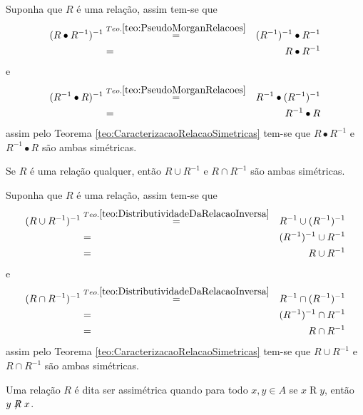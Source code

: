 \begin{prova}
	Suponha que $R$ é uma relação, assim tem-se que 
	\begin{eqnarray*}
		(R \bullet R^{-1})^{-1} & \stackrel{Teo. \ref{teo:PseudoMorganRelacoes}}{=} & (R^{-1})^{-1} \bullet R^{-1}\\
		&\stackrel{}{=}& R \bullet R^{-1}
	\end{eqnarray*}
	e
	\begin{eqnarray*}
		(R^{-1} \bullet R)^{-1} & \stackrel{Teo. \ref{teo:PseudoMorganRelacoes}}{=} &  R^{-1} \bullet (R^{-1})^{-1}\\
		&\stackrel{}{=}& R^{-1} \bullet R
	\end{eqnarray*}
	assim pelo Teorema \ref{teo:CaracterizacaoRelacaoSimetricas} tem-se que $R \bullet R^{-1}$ e  $R^{-1} \bullet R$ são ambas simétricas.
\end{prova}

\begin{teorema}
	Se $R$ é uma relação qualquer, então $R \cup R^{-1}$ e  $R \cap R^{-1}$ são ambas simétricas.
\end{teorema}

\begin{prova}
	Suponha que $R$ é uma relação, assim tem-se que 
	\begin{eqnarray*}
		(R \cup R^{-1})^{-1} & \stackrel{Teo. \ref{teo:DistributividadeDaRelacaoInversa}}{=} & R^{-1} \cup (R^{-1})^{-1}\\
		& = & (R^{-1})^{-1} \cup R^{-1}\\
		&\stackrel{}{=} & R \cup R^{-1}
	\end{eqnarray*}
	e
	\begin{eqnarray*}
		(R \cap R^{-1})^{-1} & \stackrel{Teo. \ref{teo:DistributividadeDaRelacaoInversa}}{=} & R^{-1} \cap (R^{-1})^{-1}\\
		& = & (R^{-1})^{-1} \cap R^{-1}\\
		&\stackrel{}{=} & R \cap R^{-1}
	\end{eqnarray*}
	assim pelo Teorema \ref{teo:CaracterizacaoRelacaoSimetricas} tem-se que $R \cup R^{-1}$ e  $R \cap R^{-1}$ são ambas simétricas.
\end{prova}


\begin{definicao}\label{def:RelacaoAssimétrica}
	Uma relação $R$ é dita ser assimétrica quando para todo $x, y \in A$ se $x \mathrel{R} y$, então $y \centernot{R} x$.
\end{definicao}

